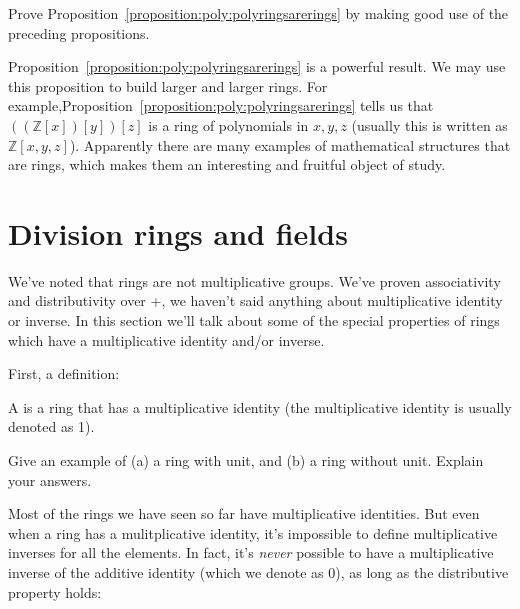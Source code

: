 \begin{exercise}{}
Prove Proposition~\ref{proposition:poly:polyringsarerings} by making good use of the preceding propositions.
\end{exercise}

Proposition~\ref{proposition:poly:polyringsarerings} is a powerful result. We may use this proposition to build larger and larger rings. For example,Proposition~\ref{proposition:poly:polyringsarerings} tells us that $((\mathbb{Z}[x])[y])[z]$ is a ring of polynomials in $x,y,z$  (usually this is written as $\mathbb{Z}[x,y,z]$). Apparently there are many examples of mathematical structures that are rings, which makes them an interesting and fruitful object of study.

\section{Division rings and fields\quad
{}}

We've noted that rings are not multiplicative groups.  We've proven associativity and distributivity over +, we haven't said anything about multiplicative identity or inverse. In this section we'll talk about some of the special properties of rings which have a multiplicative  identity and/or inverse.

First, a definition:

\begin{defn}
A  is a ring that has a multiplicative identity (the multiplicative identity is usually denoted as 1).
\end{defn}

\begin{exercise}{}
Give an example of (a) a ring with unit, and (b) a ring without unit. Explain your answers.
\end{exercise}
Most of the rings we have seen so far have multiplicative identities. But even when a ring has a mulitplicative identity, it's impossible to define multiplicative inverses for all the elements. In fact, it's  \emph{never} possible to  have a multiplicative inverse of the additive identity (which we denote as 0), as long as the distributive property holds:

